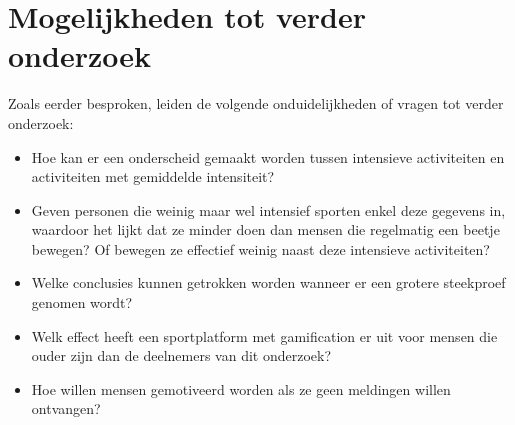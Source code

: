 \section{Mogelijkheden tot verder onderzoek}

Zoals eerder besproken, leiden de volgende onduidelijkheden of vragen tot verder onderzoek:

\begin{itemize}
    \item Hoe kan er een onderscheid gemaakt worden tussen intensieve activiteiten en activiteiten met gemiddelde intensiteit?
    \item Geven personen die weinig maar wel intensief sporten enkel deze gegevens in, waardoor het lijkt dat ze minder doen dan mensen die regelmatig een beetje bewegen? Of bewegen ze effectief weinig naast deze intensieve activiteiten?
    \item Welke conclusies kunnen getrokken worden wanneer er een grotere steekproef genomen wordt?
    \item Welk effect heeft een sportplatform met gamification er uit voor mensen die ouder zijn dan de deelnemers van dit onderzoek?
    \item Hoe willen mensen gemotiveerd worden als ze geen meldingen willen ontvangen?
\end{itemize}